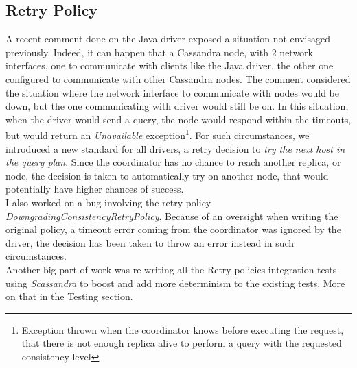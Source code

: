 \documentclass[a4paper]{report}
\begin{document}
\subsection{Retry Policy}
A recent comment done on the Java driver exposed a situation not envisaged previously. Indeed, it can happen that a Cassandra node, with 2 network interfaces, one to communicate with clients like the Java driver, the other one configured to communicate with other Cassandra nodes. The comment considered the situation where the network interface to communicate with nodes would be down, but the one communicating with driver would still be on. In this situation, when the driver would send a query, the node would respond within the timeouts, but would return an \emph{Unavailable} exception\footnote{Exception thrown when the coordinator knows before executing the request, that there is not enough replica alive to perform a query with the requested consistency level}. For such circumstances, we introduced a new standard for all drivers, a retry decision to \emph{try the next host in the query plan}. Since the coordinator has no chance to reach another replica, or node, the decision is taken to automatically try on another node, that would potentially have higher chances of success.\\
I also worked on a bug involving the retry policy \emph{DowngradingConsistencyRetryPolicy}. Because of an oversight when writing the original policy, a timeout error coming from the coordinator was ignored by the driver, the decision has been taken to throw an error instead in such circumstances.\\
Another big part of work was re-writing all the Retry policies integration tests using \emph{Scassandra} to boost and add more determinism to the existing tests. More on that in the Testing section.
\end{document}
